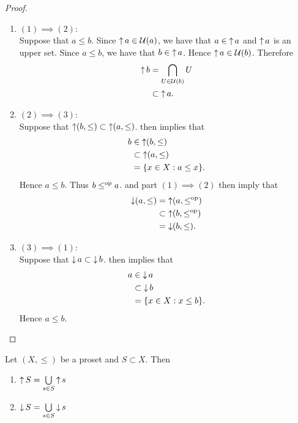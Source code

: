 \documentclass{book}
\begin{document}
	\begin{proof}\
		\begin{enumerate}
			\item $(1) \implies (2)$: \\
			Suppose that $a \leq b$. Since $\operatorname{\uparrow} a \in \mathcal{U}(a)$, we have that $a \in \operatorname{\uparrow} a$ and $\operatorname{\uparrow} a$ is an upper set. Since $a \leq b$, we have that $b \in \operatorname{\uparrow} a$. Hence $\operatorname{\uparrow} a \in \mathcal{U}(b)$. Therefore
			\begin{align*}
				\operatorname{\uparrow} b
				& = \bigcap\limits_{U \in \mathcal{U}(b)} U \\
				& \subset \operatorname{\uparrow} a.
			\end{align*}
			\item $(2) \implies (3)$: \\
			Suppose that $\operatorname{\uparrow} (b, \leq) \subset \operatorname{\uparrow} (a, \leq)$.  then implies that
			\begin{align*}
				b
				& \in \operatorname{\uparrow} (b, \leq) \\
				& \subset \operatorname{\uparrow} (a, \leq) \\
				& = \{x \in X: a \leq x\}.
			\end{align*}
			Hence $a \leq b$. Thus $b \leq^{\text{op}} a$.  and part $(1) \implies (2)$ then imply that 
			\begin{align*}
				\operatorname{\downarrow}(a, \leq)
				& = \operatorname{\uparrow}(a, \leq^{\text{op}}) \\
				& \subset \operatorname{\uparrow}(b, \leq^{\text{op}}) \\
				& = \operatorname{\downarrow}(b, \leq).
			\end{align*} 
			\item $(3) \implies (1)$: \\
			Suppose that $\operatorname{\downarrow} a \subset \operatorname{\downarrow} b$.  then implies that 
			\begin{align*}
				a
				& \in \operatorname{\downarrow} a \\
				& \subset \operatorname{\downarrow} b \\
				& = \{x \in X: x \leq b\}. 
			\end{align*} 
			Hence $a \leq b$.
		\end{enumerate}
	\end{proof}
	
	\begin{ex} 
		Let $(X, \leq)$ be a proset and $S \subset X$. Then 
		\begin{enumerate}
			\item $\operatorname{\uparrow} S = \bigcup\limits_{s \in S} \operatorname{\uparrow} s$
			\item $\operatorname{\downarrow} S = \bigcup\limits_{s \in S} \operatorname{\downarrow} s$
		\end{enumerate}
	\end{ex}
	
\end{document}
